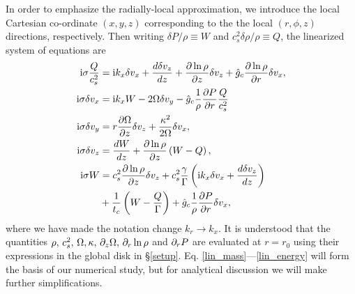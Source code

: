 In order to emphasize the radially-local approximation, we
introduce the local Cartesian co-ordinate $(x,y,z)$ corresponding to
the the local $(r,\phi,z)$ directions, respectively. Then writing
$\delta P /\rho \equiv W$ and $c_s^2\delta\rho/\rho\equiv Q$, the
linearized system of equations are 
\begin{align}
  \mathrm{i}\sigma \frac{Q}{c_s^2}  &=  \mathrm{i} k_x \delta v_x + \frac{d\delta
    v_z}{dz} + \frac{\partial\ln{\rho}}{\partial z}\delta v_z + \hat{g}_c
  \frac{\partial\ln{\rho}}{\partial r} \delta v_x,\label{lin_mass}\\
  \mathrm{i}\sigma \delta v_x  &= \mathrm{i} k_x W - 2\Omega\delta v_y -
  \hat{g}_c\frac{1}{\rho}\frac{\partial P}{\partial r}\frac{Q}{c_s^2}\label{lin_vx}\\
   \mathrm{i} \sigma\delta v_y &= r\frac{\partial \Omega}{\partial z}\delta v_z +
  \frac{\kappa^2}{2\Omega}\delta v_x, \label{lin_vy}\\
   \mathrm{i}\sigma\delta v_z &= \frac{dW}{dz} +
  \frac{\partial\ln{\rho}}{\partial z}\left(W-Q\right), \label{lin_vz}\\
  \mathrm{i} \sigma W &= c_s^2\frac{\partial\ln{\rho}}{\partial z}\delta v_z +
  c_s^2\frac{\gamma}{\Gamma} \left(\mathrm{i} k_x\delta v_x + \frac{d\delta
      v_z}{dz}\right) \notag\\
  &+ \frac{1}{t_c}\left(W - \frac{Q}{\Gamma}\right) +
  \hat{g}_c\frac{1}{\rho}\frac{\partial P}{\partial r}\delta v_x,\label{lin_energy}
\end{align}
where we have made the notation change $k_r\to k_x$. 
It is understood that the quantities $\rho,\,c_s^2,\,\Omega,\kappa,\, 
\partial_z\Omega,\, \partial_r\ln{\rho} $ and $ \partial_r P$ are evaluated at $r=r_0$
using their expressions in the global disk in \S\ref{setup}. 
Eq. \ref{lin_mass}---\ref{lin_energy} will form the basis of our numerical
study, but for analytical discussion
we will make further simplifications. 


